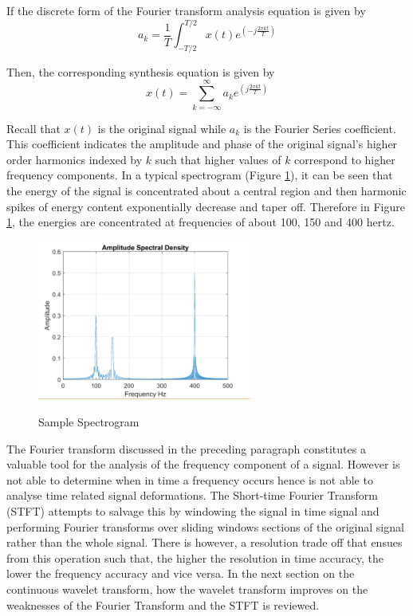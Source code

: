If the discrete form of the Fourier transform analysis equation is given by
\begin{equation}
a_k=\frac{1}{T}\int_{-T/2}^{T/2}x(t)e^{\left(-j\frac{2\pi kt}{T}\right)}
\label{eqn_c4_fourier01}
\end{equation}

Then, the corresponding synthesis equation is given by
\begin{equation}
x(t)=\sum_{k=-\infty}^{\infty}a_ke^{\left(j\frac{2\pi kt}{T}\right)}
\label{eqn_c4_fourier02}
\end{equation}

Recall that $x(t)$ is the original signal while $a_k$ is the Fourier Series coefficient.  This coefficient indicates the amplitude and phase of the original signal's higher order harmonics indexed by $k$ such that higher values of $k$ correspond to higher frequency components.  In a typical spectrogram (Figure \ref{fig_4_2_spectral}), it can be seen that the energy of the signal is concentrated about a central region and then harmonic spikes of energy content exponentially decrease and taper off.  Therefore in Figure \ref{fig_4_2_spectral}, the energies are concentrated at frequencies of about 100, 150 and 400 hertz.
\begin{figure}
\centering
  \includegraphics[width=7cm]{thesis/images/spectral.png}\\
  \caption{Sample Spectrogram} \cite{cwt_lecture}\label{fig_4_2_spectral}
\end{figure}

The Fourier transform discussed in the preceding paragraph constitutes a valuable tool for the analysis of the frequency component of a signal.  However is not able to determine when in time a frequency occurs hence is not able to analyse time related signal deformations.  The Short-time Fourier Transform (STFT) attempts to salvage this by windowing the signal in time signal and performing Fourier transforms over sliding windows sections of the original signal rather than the whole signal.  There is however, a resolution trade off that ensues from this operation such that, the higher the resolution in time accuracy, the lower the frequency accuracy and vice versa.  In the next section on the continuous wavelet transform, how the wavelet transform improves on the weaknesses of the Fourier Transform and the STFT is reviewed.

